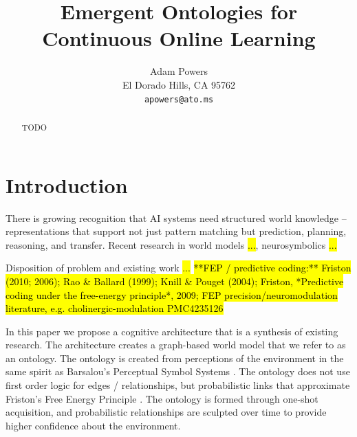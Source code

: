 \documentclass{article}
\title{Emergent Ontologies for Continuous Online Learning}
\author{%
  Adam Powers \\
  El Dorado Hills, CA 95762 \\
  \texttt{apowers@ato.ms} \\
}
\begin{document}
\maketitle


\begin{abstract}
  TODO
\end{abstract}



\section{Introduction}
There is growing recognition that AI systems need structured world knowledge -- representations that support not just pattern matching but prediction, planning, reasoning, and transfer. Recent research in world models \hl{...}, neurosymbolics \hl{...}

Disposition of problem and existing work \hl{...}
\hl{**FEP / predictive coding:** Friston (2010; 2006); Rao \& Ballard (1999); Knill \& Pouget (2004); Friston, *Predictive coding under the free-energy principle*, 2009; FEP precision/neuromodulation literature, e.g. cholinergic-modulation PMC4235126}

In this paper we propose a cognitive architecture that is a synthesis of existing research. The architecture creates a graph-based world model that we refer to as an ontology. The ontology is created from perceptions of the environment in the same spirit as Barsalou's Perceptual Symbol Systems \citep{Barsalou_1999}. The ontology does not use first order logic for edges / relationships, but probabilistic links that approximate Friston's Free Energy Principle \citep{friston_free_2006}. The ontology is formed through one-shot acquisition, and probabilistic relationships are sculpted over time to provide higher confidence about the environment.
\end{document}
